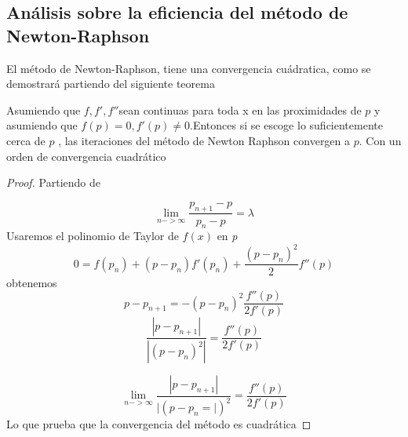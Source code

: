 \subsection{Análisis sobre la eficiencia del método de Newton-Raphson}

El método de Newton-Raphson, tiene una convergencia cuádratica, como se demostrará partiendo del siguiente teorema

\begin{theorem}
Asumiendo que $f,f',f''  $sean continuas para toda x en las proximidades de $p$ y asumiendo que $f(p) = 0, f'(p) \neq 0 $.Entonces si se escoge lo suficientemente cerca de $p$ , las iteraciones del método de Newton Raphson convergen a $p$. Con un orden de convergencia cuadrático
\end{theorem}

\begin{proof}
Partiendo de 

\begin{displaymath}
\lim_{n->\infty}{\frac{p_{n+1} - p}{p_n - p}} = \lambda
\end{displaymath}
Usaremos el polinomio de Taylor de $f(x)$ en \textit{p}
\begin{displaymath}
 0 = f(p_n) + (p-p_n)f'(p_n) + \frac{(p-p_n)^2}{2}f''(p)
\end{displaymath}
obtenemos
\begin{displaymath}
p - p_{n+1} =  - (p-p_n)^2 \frac{f''(p)}{2f'(p)}
\end{displaymath}
\begin{displaymath}
\frac{|p - p_{n+1}|}{|(p-p_n)^2|} = \frac{f''(p)}{2f'(p)}
\end{displaymath}

\begin{displaymath}
\lim_{n->\infty}{\frac{|p - p_{n+1}|}{|(p-p_n=|)^2}} =  \frac{f''(p)}{2f'(p)}
\end{displaymath}
Lo que prueba que la convergencia del método es cuadrática
\end{proof}

